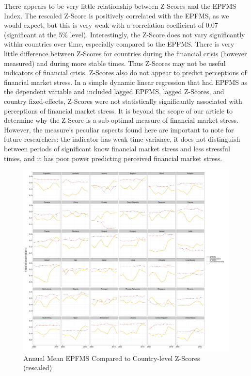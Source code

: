 \documentclass[]{article}
\begin{document}
There appears to be very little relationship between Z-Scores and the EPFMS Index. The rescaled Z-Score is positively correlated with the EPFMS, as we would expect, but this is very weak with a correlation coefficient of 0.07 (significant at the 5\% level). Interestingly, the Z-Score does not vary significantly within countries over time, especially compared to the EPFMS. There is very little difference between Z-Scores for countries during the financial crisis (however measured) and during more stable times. Thus Z-Scores may not be useful indicators of financial crisis. Z-Scores also do not appear to predict perceptions of financial market stress. In a simple dynamic linear regression that had EPFMS as the dependent variable and included lagged EPFMS, lagged Z-Scores, and country fixed-effects, Z-Scores were not statistically significantly associated with perceptions of financial market stress. It is beyond the scope of our article to determine why the Z-Score is a sub-optimal measure of financial market stress. However, the measure's peculiar aspects found here are important to note for future researchers: the indicator has weak time-variance, it does not distinguish between periods of significant know financial market stress and less stressful times, and it has poor power predicting perceived financial market stress.

\begin{landscape}
\begin{figure}

    \caption{Annual Mean EPFMS Compared to Country-level Z-Scores (rescaled)}
    \label{z_score}

    \begin{center}
        \includegraphics[scale=0.4]{analysis/figures/compare_to_z-score.pdf}
    \end{center}

\end{figure}
\end{landscape}
\end{document}
